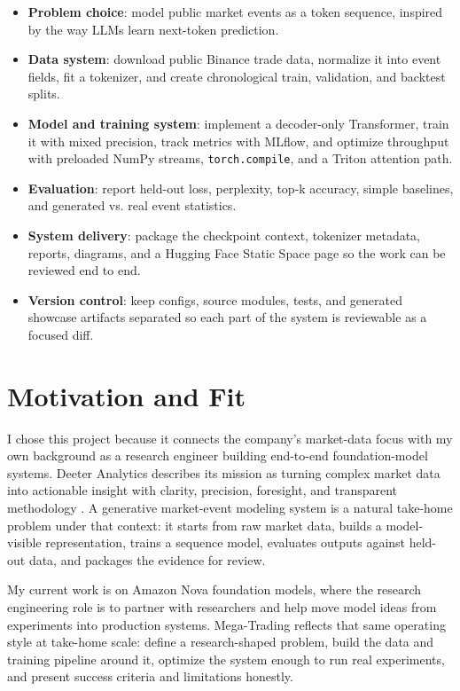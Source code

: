 \documentclass[11pt]{article}
\begin{document}
\begin{itemize}[leftmargin=1.6em]
  \item \textbf{Problem choice}: model public market events as a token sequence,
  inspired by the way LLMs learn next-token prediction.
  \item \textbf{Data system}: download public Binance trade data, normalize it
  into event fields, fit a tokenizer, and create chronological train,
  validation, and backtest splits.
  \item \textbf{Model and training system}: implement a decoder-only
  Transformer, train it with mixed precision, track metrics with MLflow, and
  optimize throughput with preloaded NumPy streams, \texttt{torch.compile}, and
  a Triton attention path.
  \item \textbf{Evaluation}: report held-out loss, perplexity, top-k accuracy,
  simple baselines, and generated vs. real event statistics.
  \item \textbf{System delivery}: package the checkpoint context, tokenizer
  metadata, reports, diagrams, and a Hugging Face Static Space page so the work
  can be reviewed end to end.
  \item \textbf{Version control}: keep configs, source modules, tests, and
  generated showcase artifacts separated so each part of the system is
  reviewable as a focused diff.
\end{itemize}

\section{Motivation and Fit}

I chose this project because it connects the company's market-data focus with my
own background as a research engineer building end-to-end foundation-model
systems. Deeter Analytics describes its mission as turning complex market data
into actionable insight with clarity, precision, foresight, and transparent
methodology \cite{deeteranalytics}. A generative market-event modeling system is
a natural take-home problem under that context: it starts from raw market data,
builds a model-visible representation, trains a sequence model, evaluates
outputs against held-out data, and packages the evidence for review.

My current work is on Amazon Nova foundation models, where the research
engineering role is to partner with researchers and help move model ideas from
experiments into production systems. Mega-Trading reflects that same operating
style at take-home scale: define a research-shaped problem, build the data and
training pipeline around it, optimize the system enough to run real experiments,
and present success criteria and limitations honestly.
\end{document}
